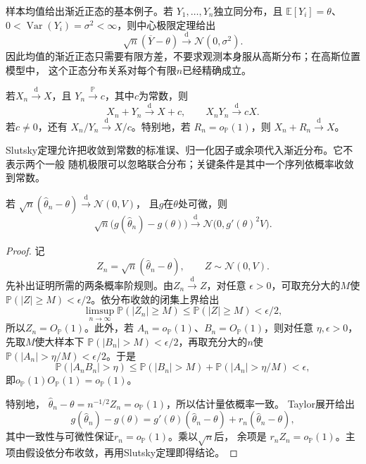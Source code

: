 样本均值给出渐近正态的基本例子。若
\(Y_1,\ldots,Y_n\)独立同分布，且
\(\mathbb{E}[Y_i]=\theta\)、
\(0<\operatorname{Var}(Y_i)=\sigma^2<\infty\)，则中心极限定理给出
\[
  \sqrt n(\overline Y-\theta)
  \xrightarrow{\mathrm d}\mathcal N(0,\sigma^2).
\]
因此均值的渐近正态只需要有限方差，不要求观测本身服从高斯分布；在高斯位置模型中，
这个正态分布关系对每个有限\(n\)已经精确成立。

\begin{theorem}[Slutsky定理]
  \label{thm:statistics-slutsky}
  若\(X_n\xrightarrow{\mathrm d}X\)，且
  \(Y_n\xrightarrow{\mathbb{P}}c\)，其中\(c\)为常数，则
  \[
    X_n+Y_n\xrightarrow{\mathrm d}X+c,\qquad
    X_nY_n\xrightarrow{\mathrm d}cX.
  \]
  若\(c\neq0\)，还有
  \(X_n/Y_n\xrightarrow{\mathrm d}X/c\)。特别地，若
  \(R_n=o_{\mathbb{P}}(1)\)，则
  \(X_n+R_n\xrightarrow{\mathrm d}X\)。
\end{theorem}

Slutsky定理允许把收敛到常数的标准误、归一化因子或余项代入渐近分布。它不表示两个一般
随机极限可以忽略联合分布；关键条件是其中一个序列依概率收敛到常数。

\begin{theorem}[Delta方法]
\label{thm:statistics-delta-method}
若
\(\sqrt n(\widehat\theta_n-\theta)\xrightarrow{\mathrm d}\mathcal N(0,V)\)，
且\(g\)在\(\theta\)处可微，则
\[
  \sqrt n\bigl(g(\widehat\theta_n)-g(\theta)\bigr)
  \xrightarrow{\mathrm d}
  \mathcal N\bigl(0,g'(\theta)^2V\bigr).
\]
\end{theorem}

\begin{proof}
记
\[
  Z_n=\sqrt n(\widehat\theta_n-\theta),
  \qquad
  Z\sim\mathcal N(0,V).
\]
先补出证明所需的两条概率阶规则。由\(Z_n\xrightarrow{\mathrm d}Z\)，对任意
\(\epsilon>0\)，可取充分大的\(M\)使
\(\mathbb{P}(|Z|\geq M)<\epsilon/2\)。依分布收敛的闭集上界给出
\[
  \limsup_{n\to\infty}\mathbb{P}(|Z_n|\geq M)
  \leq \mathbb{P}(|Z|\geq M)<\epsilon/2,
\]
所以\(Z_n=O_{\mathbb{P}}(1)\)。此外，若
\(A_n=o_{\mathbb{P}}(1)\)、\(B_n=O_{\mathbb{P}}(1)\)，则对任意
\(\eta,\epsilon>0\)，先取\(M\)使大样本下
\(\mathbb{P}(|B_n|>M)<\epsilon/2\)，再取充分大的\(n\)使
\(\mathbb{P}(|A_n|>\eta/M)<\epsilon/2\)。于是
\[
  \mathbb{P}(|A_nB_n|>\eta)
  \leq
  \mathbb{P}(|B_n|>M)
  +\mathbb{P}(|A_n|>\eta/M)
  <\epsilon,
\]
即\(o_{\mathbb{P}}(1)O_{\mathbb{P}}(1)=o_{\mathbb{P}}(1)\)。

特别地，
\(\widehat\theta_n-\theta=n^{-1/2}Z_n=o_{\mathbb{P}}(1)\)，所以估计量依概率一致。
Taylor展开给出
\[
  g(\widehat\theta_n)-g(\theta)
  =g'(\theta)(\widehat\theta_n-\theta)
   +r_n(\widehat\theta_n-\theta),
\]
其中一致性与可微性保证\(r_n=o_{\mathbb{P}}(1)\)。乘以\(\sqrt n\)后，
余项是
\(r_nZ_n=o_{\mathbb{P}}(1)\)。主项由假设依分布收敛，再用Slutsky定理即得结论。
\end{proof}

